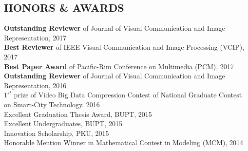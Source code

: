 \documentclass[margin, 10pt]{res} %
\begin{document}
\begin{resume}
%



\section{HONORS \& AWARDS}
{\bf Outstanding Reviewer} of Journal of Visual Communication and Image Representation, \hfill 2017 \\
{\bf Best Reviewer} of IEEE Visual Communication and Image Processing (VCIP), \hfill 2017 \\
{\bf Best Paper Award} of Pacific-Rim Conference on Multimedia (PCM), \hfill 2017 \\
{\bf Outstanding Reviewer} of Journal of Visual Communication and Image Representation, \hfill 2016 \\
{\bf ${1}^{st}$} prize of Video Big Data Compression Contest of National Graduate Contest on Smart-City Technology. \hfill 2016 \\
Excellent Graduation Thesis Award, BUPT, \hfill 2015 \\
Excellent Undergraduates, BUPT, \hfill 2015 \\
Innovation Scholarship, PKU, \hfill 2015 \\
Honorable Mention Winner in Mathematical Contest in Modeling (MCM), \hfill 2014 \\


\end{resume}
\end{document}

